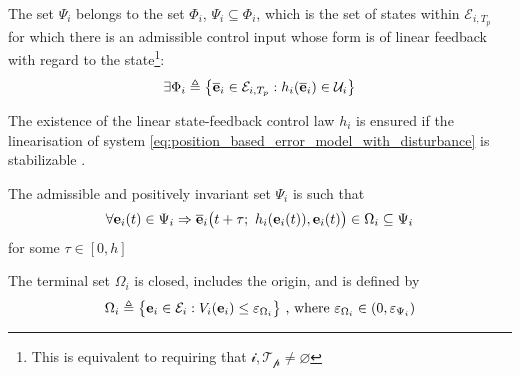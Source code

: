\begin{bw_box}
  \begin{assumption}
  The set $\Psi_i$ belongs to the set $\Phi_i$, $\Psi_i \subseteq \Phi_i$,
  which is the set of states within $\mathcal{E}_{i,T_p}$ for which there is an
  admissible control input whose form is of linear feedback with regard to the
  state\footnote{This is equivalent to requiring that $\mathcal{i,T_p} \neq \varnothing$}:
  \begin{align}
    \exists \Phi_i \triangleq \big\{\overline{\bm{\mathbf{e}}}_i \in \mathcal{E}_{i,T_p} : h_i(\overline{\bm{\mathbf{e}}}_i) \in \mathcal{U}_i \big\}
  \end{align}
  \label{ass:phi_psi}
  \end{assumption}
\end{bw_box}

\begin{bw_box}
  \begin{remark}
    The existence of the linear state-feedback control law $h_i$ is ensured if
    the linearisation of system \eqref{eq:position_based_error_model_with_disturbance}
    is stabilizable \cite{262032}\cite{FINDEISEN2003190}.
    \label{remark:aux_control_stabilizability}
  \end{remark}
\end{bw_box}


\begin{bw_box}
  \begin{assumption}
  \label{ass:psi_omega}
  The admissible and positively invariant set $\Psi_i$ is such that
  \begin{align}
  \forall \bm{\mathbf{e}}_i(t) \in \Psi_i \Rightarrow \overline{\bm{\mathbf{e}}}_i\big(t+\tau;\ h_i(\bm{\mathbf{e}}_i(t)), \bm{\mathbf{e}}_i(t)\big) \in \Omega_i \subseteq \Psi_i
  \end{align}
  for some $\tau \in [0,h]$
  \end{assumption}
\end{bw_box}

\begin{bw_box}
  \begin{assumption}
  \label{ass:omega}
  The terminal set $\Omega_i$ is closed, includes the origin, and is defined by
  \begin{align}
    \Omega_i \triangleq \big\{\bm{\mathbf{e}}_i \in \mathcal{E}_i : V_i(\bm{\mathbf{e}}_i)
      \leq \varepsilon_{\Omega_i}\big\}\ \text{, where } \varepsilon_{\Omega_i} \in (0, \varepsilon_{\Psi_i})
  \end{align}
  \end{assumption}
\end{bw_box}

